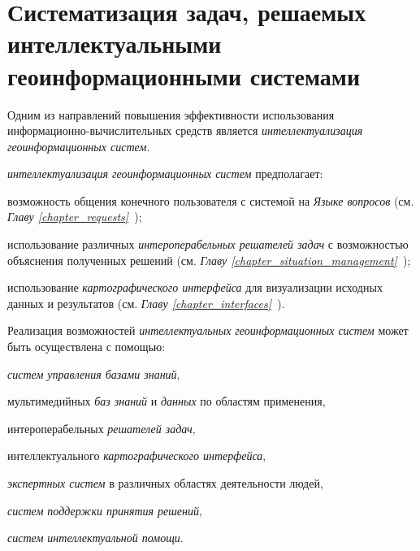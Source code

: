 \section{Систематизация задач, решаемых интеллектуальными геоинформационными системами}
\label{chapter_gis_sec_tasks}

Одним из направлений повышения эффективности использования информационно-вычислительных средств является \textit{интеллектуализация геоинформационных систем}.

\textit{интеллектуализация геоинформационных систем} предполагает:
\begin{textitemize}
	\item возможность общения конечного пользователя с системой на \textit{Языке вопросов} (см. \textit{Главу \ref{chapter_requests}~});
	\item использование различных \textit{интероперабельных решателей задач} с возможностью объяснения полученных решений (см. \textit{Главу \ref{chapter_situation_management}~}); 
	\item использование \textit{картографического интерфейса} для визуализации исходных данных и результатов (см. \textit{Главу \ref{chapter_interfaces}~}).
\end{textitemize}

Реализация возможностей \textit{интеллектуальных геоинформационных систем} может быть осуществлена с помощью:
\begin{textitemize}
	\item \textit{систем управления базами знаний},
	\item мультимедийных \textit{баз знаний} и \textit{данных} по областям применения,
	\item интероперабельных \textit{решателей задач},
	\item интеллектуального \textit{картографического интерфейса},
	\item \textit{экспертных систем} в различных областях деятельности людей,
	\item \textit{систем поддержки принятия решений},
	\item \textit{систем интеллектуальной помощи}.
\end{textitemize}


